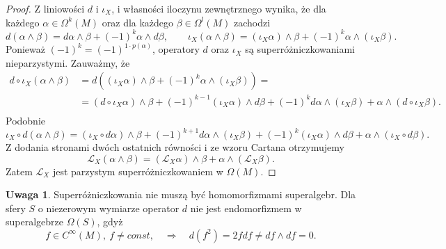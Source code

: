 \documentclass[11pt,a4paper]{report}
\theoremstyle{definition}
\newtheorem{remark}[theorem]{Uwaga}
\begin{document}
\begin{proof}
	Z liniowości $d$ i $\iota_X$, i własności iloczynu zewnętrznego wynika, że dla każdego $\alpha \in \Omega^k(M)$ oraz dla każdego $\beta \in \Omega^l(M)$ zachodzi
	\begin{equation*} 
		d(\alpha \wedge \beta) = d\alpha \wedge \beta + (-1)^{k} \alpha \wedge d \beta,\qquad \iota_X(\alpha \wedge \beta) = (\iota_X \alpha) \wedge \beta + (-1)^{k} \alpha \wedge (\iota_X \beta).
	\end{equation*}
	Ponieważ $(-1)^k = (-1)^{1 \cdot p(\alpha)}$, operatory $d$ oraz $\iota_X$ są superróżniczkowaniami nieparzystymi. Zauważmy, że
	\begin{equation*} 
		\begin{aligned}
			d \circ \iota_X (\alpha \wedge \beta) & = d((\iota_X \alpha) \wedge \beta + (-1)^{k} \alpha \wedge (\iota_X \beta)) =                                                                                         \\
			                                      & = (d \circ \iota_X \alpha) \wedge \beta + (-1)^{k-1} (\iota_X \alpha) \wedge d \beta + (-1)^k d\alpha \wedge (\iota_X \beta) + \alpha \wedge (d \circ \iota_X \beta). \\
		\end{aligned}
	\end{equation*}
	Podobnie 
	\begin{equation*} 
		\iota_X \circ d (\alpha \wedge \beta) = (\iota_X \circ d \alpha) \wedge \beta + (-1)^{k+1} d \alpha \wedge (\iota_X \beta) + (-1)^k (\iota_X \alpha) \wedge d \beta + \alpha \wedge (\iota_X \circ d \beta).
	\end{equation*}
	Z dodania stronami dwóch ostatnich równości i ze wzoru Cartana otrzymujemy
	\begin{equation*}
		\mathcal{L}_X(\alpha \wedge \beta) = (\mathcal{L}_X \alpha) \wedge \beta + \alpha \wedge (\mathcal{L}_X \beta).
	\end{equation*}
	Zatem $\mathcal{L}_X$ jest parzystym superróżniczkowaniem w $\Omega(M)$.
\end{proof}

\begin{remark}
	Superróżniczkowania nie muszą być homomorfizmami superalgebr. Dla sfery $S$ o niezerowym wymiarze operator $d$ nie jest endomorfizmem w superalgebrze $\Omega(S)$, gdyż
	\begin{equation*}
		f\in C^{\infty}(M),\ f \neq const, \quad \Rightarrow \quad d(f^2) = 2fdf \neq df \wedge df = 0.
	\end{equation*}
\end{remark}
\end{document}
